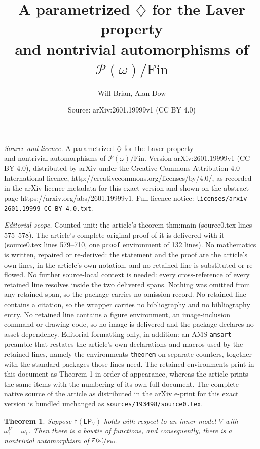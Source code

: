 \documentclass[10pt,a4paper]{amsart}
\title{A parametrized $\diamondsuit$ for the Laver property \\ and nontrivial automorphisms of $\mathcal P(\omega)/\mathrm{Fin}$}
\author{Will Brian, Alan Dow}
\date{Source: arXiv:2601.19999v1 (CC BY 4.0)}
\newtheorem{theorem}{Theorem}
\newcommand{\pwmf}{\nicefrac{\mathcal{P}(\w)}{\mathrm{Fin}}}
\newcommand{\w}{\omega}
\begin{document}
\maketitle

\noindent\emph{Source and licence.} A parametrized $\diamondsuit$ for the Laver property \\ and nontrivial automorphisms of $\mathcal P(\omega)/\mathrm{Fin}$. Version arXiv:2601.19999v1 (CC BY 4.0), distributed by arXiv under the Creative Commons Attribution 4.0 International licence, http://creativecommons.org/licenses/by/4.0/, as recorded in the arXiv licence metadata for this exact version and shown on the abstract page https://arxiv.org/abs/2601.19999v1. Full licence notice: \texttt{licenses/arxiv-2601.19999-CC-BY-4.0.txt}.\par\smallskip

\noindent\textit{Editorial scope.} Counted unit: the article's theorem thm:main (source0.tex lines 575--578). The article's complete original proof of it is delivered with it (source0.tex lines 579--710, one \texttt{proof} environment of 132 lines). No mathematics is written, repaired or re-derived: the statement and the proof are the article's own lines, in the article's own notation, and no retained line is substituted or re-flowed.  No further source-local context is needed: every cross-reference of every retained line resolves inside the two delivered spans.  Nothing was omitted from any retained span, so the package carries no omission record.  No retained line contains a citation, so the wrapper carries no bibliography and no bibliography entry.  No retained line contains a figure environment, an image-inclusion command or drawing code, so no image is delivered and the package declares no asset dependency.  Editorial formatting only, in addition: an AMS \texttt{amsart} preamble that restates the article's own declarations and macros used by the retained lines, namely the environments \texttt{theorem} on separate counters, together with the standard packages those lines need.  The retained environments print in this document as Theorem 1 in order of appearance, whereas the article prints the same items with the numbering of its own full document.  The complete native source of the article as distributed in the arXiv e-print for this exact version is bundled unchanged as \texttt{sources/193498/source0.tex}.
\begin{theorem}\label{thm:main}
Suppose $\dagger(\mathsf{LP}_V)$ holds with respect to an inner model $V$ with $\w_1^V = \w_1$.  
Then there is a bowtie of functions, and consequently, there is a nontrivial automorphism of $\pwmf$. 
\end{theorem}
\end{document}
